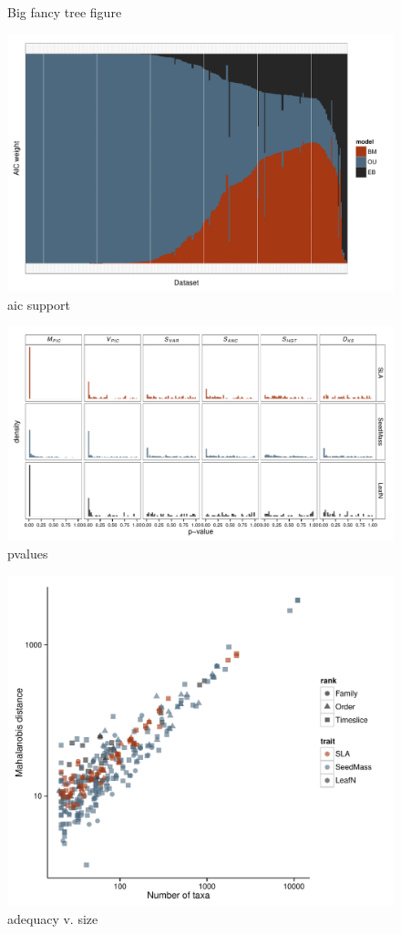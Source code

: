\documentclass[a4paper,12pt]{article}
\begin{document}
\begin{figure}[p]
  \centering
  \caption{Big fancy tree figure}
  \label{fig:angio-phylogeny}
\end{figure}

\begin{figure}[p]
  \centering
  \includegraphics[scale=0.7]{figs/AIC-support}
  \caption{aic support}
  \label{fig:aic-support}
\end{figure}

\begin{figure}[p]
  \centering
  \includegraphics{figs/pvalue-hist-ML}
  \caption{pvalues}
  \label{fig:pvalues}
\end{figure}

\begin{figure}[p]
  \centering
  \includegraphics[scale=0.9]{figs/Size-adequacy-ML-bestonly}
  \caption{adequacy v. size}
  \label{fig:size-adequacy}
\end{figure}
\end{document}
